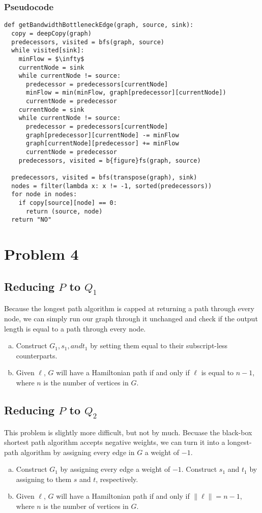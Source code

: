 \documentclass{math}
\begin{document}
\subsubsection*{Pseudocode}
\begin{lstlisting}[mathescape=true]
def getBandwidthBottleneckEdge(graph, source, sink):
  copy = deepCopy(graph)
  predecessors, visited = bfs(graph, source)
  while visited[sink]:
    minFlow = $\infty$
    currentNode = sink
    while currentNode != source:
      predecessor = predecessors[currentNode]
      minFlow = min(minFlow, graph[predecessor][currentNode])
      currentNode = predecessor
    currentNode = sink
    while currentNode != source:
      predecessor = predecessors[currentNode]
      graph[predecessor][currentNode] -= minFlow
      graph[currentNode][predecessor] += minFlow
      currentNode = predecessor
    predecessors, visited = b{figure}fs(graph, source)

  predecessors, visited = bfs(transpose(graph), sink)
  nodes = filter(lambda x: x != -1, sorted(predecessors))
  for node in nodes:
    if copy[source][node] == 0:
      return (source, node)
  return "NO"
\end{lstlisting}


\section*{Problem 4}

\subsection*{Reducing \( P \) to \( Q_1 \)}
Because the longest path algorithm is capped at returning a path through every
node, we can simply run our graph through it unchanged and check if the output
length is equal to a path through every node.
\begin{enumerate}[a.]
  \item Construct \( G_1, s_1, and t_1 \) by setting them equal to their
  subscript-less counterparts.
  \item Given \( \ell \), \( G \) will have a Hamiltonian path if and only
  if \( \ell \) is equal to \( n - 1 \), where \( n \) is the number of
  vertices in \( G \).
\end{enumerate}

\subsection*{Reducing \( P \) to \( Q_2 \)}
This problem is slightly more difficult, but not by much.  Becuase the black-box
shortest path algorithm accepts negative weights, we can turn it into a
longest-path algorithm by assigning every edge in \( G \) a weight of \( -1 \).
\begin{enumerate}[a.]
  \item Construct \( G_1 \) by assigning every edge a weight of \( -1 \).
  Construct $s_1$ and $t_1$ by assigning to them $s$ and $t$,
  respectively.
  \item Given \( \ell \), \( G \) will have a Hamiltonian path if and only if
  \( \|\ell\| = n - 1 \), where \( n \) is the number of vertices in \( G \).
\end{enumerate}
\end{document}
